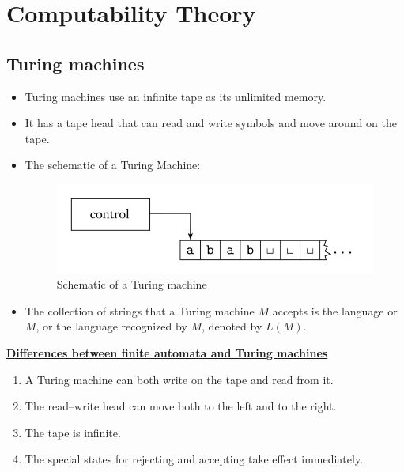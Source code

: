\documentclass[11pt]{article}
\theoremstyle{definition}
\begin{document}
\section{Computability Theory}
\subsection{Turing machines}
\begin{itemize}[leftmargin=*]
    \item Turing machines use an infinite tape as its unlimited memory.
    \item It has a tape head that can read and write symbols and move around on the tape.
    \item The schematic of a Turing Machine:
    \begin{figure}[h]
    	\centering
    	\includegraphics[width=0.5\linewidth]{tm.png}
    	\caption{Schematic of a Turing machine}
    	\label{fig}
    \end{figure}
    \item The collection of strings that a Turing machine $M$ accepts is the language or $M$, or the language recognized by $M$, denoted by $L(M)$.
\end{itemize}
\textbf{\underline{Differences between finite automata and Turing machines}}
\begin{enumerate}
    \item A Turing machine can both write on the tape and read from it.
    \item The read–write head can move both to the left and to the right.
    \item The tape is infinite.
    \item The special states for rejecting and accepting take effect immediately.
\end{enumerate}
\end{document}
